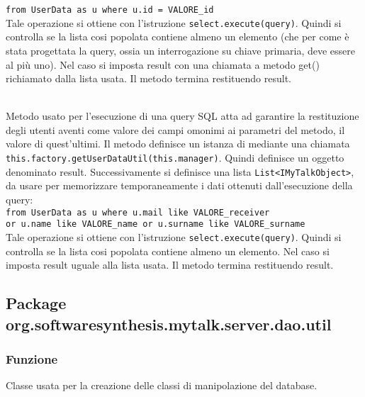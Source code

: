 \begin{description}
	\verb|from UserData as u where u.id = VALORE_id|\\
	
	Tale operazione si ottiene con l'istruzione \verb|select.execute(query)|. Quindi si controlla se la lista cosi popolata contiene almeno un elemento (che per come è stata progettata la query, ossia un interrogazione su chiave primaria, deve essere al più uno). Nel caso si imposta result con una chiamata a metodo get() richiamato dalla lista usata. Il metodo termina restituendo result.
	
	\item{}\\
	Metodo usato per l'esecuzione di una query SQL atta ad garantire la restituzione degli utenti aventi come valore dei campi omonimi ai parametri del metodo, il valore di quest'ultimi. Il metodo definisce un istanza di  mediante una chiamata \\ \verb|this.factory.getUserDataUtil(this.manager)|. Quindi definisce un oggetto  denominato result. Successivamente si definisce una lista \texttt{List<IMyTalkObject>}, da usare per memorizzare temporaneamente i dati ottenuti dall'esecuzione della query:\\
	
	\verb|from UserData as u where u.mail like VALORE_receiver|\\
	\verb|or u.name like VALORE_name or u.surname like VALORE_surname|\\
	
	Tale operazione si ottiene con l'istruzione \verb|select.execute(query)|. Quindi si controlla se la lista cosi popolata contiene almeno un elemento. Nel caso si imposta result uguale alla lista usata. Il metodo termina restituendo result.
	
\end{description}

\subsection{Package org.softwaresynthesis.mytalk.server.dao.util}\label{sec:daoUtil}


\subsubsection*{Funzione}
Classe usata per la creazione delle classi di manipolazione del database.

